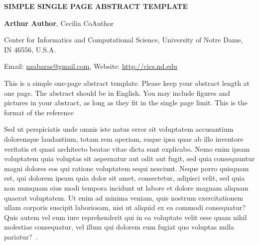 \documentclass[a4paper]{article}
\begin{document}
	
	\hspace{20pt}
	
	\Large
	\begin{center}
		\textbf{\uppercase{Simple Single Page Abstract Template}}\\
		
		\hspace{10pt}
		
		\large
		\textbf{Arthur Author}, Cecilia CoAuthor \\
		
		\hspace{10pt}
		
		\small
		Center for Informatics and Computational Science, University of Notre Dame, \\ IN 46556, U.S.A.\\
		
		\hspace{10pt}
		
		Email: \href{mailto:nzabaras@gmail.com}{nzabaras@gmail.com}, Website: \url{http://cics.nd.edu}
		
	\end{center}
	
	\hspace{10pt}
	
	\normalsize
	
	This is a simple one-page abstract template. Please keep your abstract length at one page. The abstract should be in English. You may include figures and pictures in your abstract, as long as they fit in the single page limit. This is the format of the reference~\cite{Murphy2001,Bishop:2006,Murphy2012}
	
	Sed ut perspiciatis unde omnis iste natus error sit voluptatem accusantium doloremque laudantium, totam rem aperiam, eaque ipsa quae ab illo inventore veritatis et quasi architecto beatae vitae dicta sunt explicabo. Nemo enim ipsam voluptatem quia voluptas sit aspernatur aut odit aut fugit, sed quia consequuntur magni dolores eos qui ratione voluptatem sequi nesciunt. Neque porro quisquam est, qui dolorem ipsum quia dolor sit amet, consectetur, adipisci velit, sed quia non numquam eius modi tempora incidunt ut labore et dolore magnam aliquam quaerat voluptatem. Ut enim ad minima veniam, quis nostrum exercitationem ullam corporis suscipit laboriosam, nisi ut aliquid ex ea commodi consequatur? Quis autem vel eum iure reprehenderit qui in ea voluptate velit esse quam nihil molestiae consequatur, vel illum qui dolorem eum fugiat quo voluptas nulla pariatur?~\cite{Murphy2001}.
	
	
	\let\bibhang\relax
	\normalem
	
\end{document}
